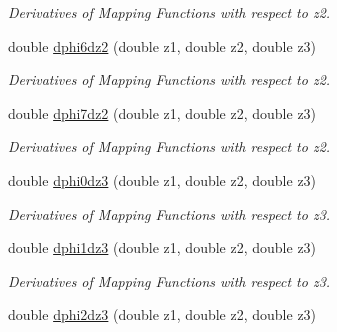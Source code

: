 \begin{DoxyCompactItemize}
\begin{DoxyCompactList}\small\item\em Derivatives of Mapping Functions with respect to z2. \item\end{DoxyCompactList}\item 
\hypertarget{classfemfunctions_a9dade90d85d7522bde69dab2683b212c}{
double \hyperlink{classfemfunctions_a9dade90d85d7522bde69dab2683b212c}{dphi6dz2} (double z1, double z2, double z3)}
\label{classfemfunctions_a9dade90d85d7522bde69dab2683b212c}

\begin{DoxyCompactList}\small\item\em Derivatives of Mapping Functions with respect to z2. \item\end{DoxyCompactList}\item 
\hypertarget{classfemfunctions_a2eede83bbc8b80b8e963b6d1790116cb}{
double \hyperlink{classfemfunctions_a2eede83bbc8b80b8e963b6d1790116cb}{dphi7dz2} (double z1, double z2, double z3)}
\label{classfemfunctions_a2eede83bbc8b80b8e963b6d1790116cb}

\begin{DoxyCompactList}\small\item\em Derivatives of Mapping Functions with respect to z2. \item\end{DoxyCompactList}\item 
\hypertarget{classfemfunctions_a0c2349f448049fc28919d149dd891eb9}{
double \hyperlink{classfemfunctions_a0c2349f448049fc28919d149dd891eb9}{dphi0dz3} (double z1, double z2, double z3)}
\label{classfemfunctions_a0c2349f448049fc28919d149dd891eb9}

\begin{DoxyCompactList}\small\item\em Derivatives of Mapping Functions with respect to z3. \item\end{DoxyCompactList}\item 
\hypertarget{classfemfunctions_a9e6d10adb9199a70ce24064f20cbba0b}{
double \hyperlink{classfemfunctions_a9e6d10adb9199a70ce24064f20cbba0b}{dphi1dz3} (double z1, double z2, double z3)}
\label{classfemfunctions_a9e6d10adb9199a70ce24064f20cbba0b}

\begin{DoxyCompactList}\small\item\em Derivatives of Mapping Functions with respect to z3. \item\end{DoxyCompactList}\item 
\hypertarget{classfemfunctions_afa7debeb8f01aefc0045f0e483df8ee1}{
double \hyperlink{classfemfunctions_afa7debeb8f01aefc0045f0e483df8ee1}{dphi2dz3} (double z1, double z2, double z3)}
\label{classfemfunctions_afa7debeb8f01aefc0045f0e483df8ee1}


\end{DoxyCompactItemize}

